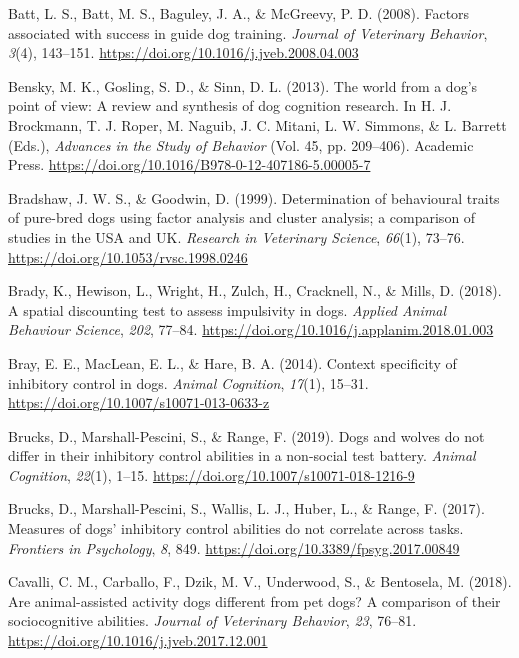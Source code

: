 \documentclass[
  ,pub,floatsintext]{apa6}
\newlength{\cslhangindent}
\newlength{\cslentryspacingunit} %
\newenvironment{CSLReferences}[2] %
 {%
  \setlength{\parindent}{0pt}
  \ifodd #1
  \let\oldpar\par
  \def\par{\hangindent=\cslhangindent\oldpar}
  \fi
  \setlength{\parskip}{#2\cslentryspacingunit}
 }%
 {}
\begin{document}
\begin{CSLReferences}{1}{0}
\leavevmode{}%
Batt, L. S., Batt, M. S., Baguley, J. A., \& McGreevy, P. D. (2008). Factors associated with success in guide dog training. \emph{Journal of Veterinary Behavior}, \emph{3}(4), 143--151. \url{https://doi.org/10.1016/j.jveb.2008.04.003}

\leavevmode{}%
Bensky, M. K., Gosling, S. D., \& Sinn, D. L. (2013). The world from a dog's point of view: A review and synthesis of dog cognition research. In H. J. Brockmann, T. J. Roper, M. Naguib, J. C. Mitani, L. W. Simmons, \& L. Barrett (Eds.), \emph{Advances in the {Study} of {Behavior}} (Vol. 45, pp. 209--406). {Academic Press}. \url{https://doi.org/10.1016/B978-0-12-407186-5.00005-7}

\leavevmode{}%
Bradshaw, J. W. S., \& Goodwin, D. (1999). Determination of behavioural traits of pure-bred dogs using factor analysis and cluster analysis; a comparison of studies in the {USA} and {UK}. \emph{Research in Veterinary Science}, \emph{66}(1), 73--76. \url{https://doi.org/10.1053/rvsc.1998.0246}

\leavevmode{}%
Brady, K., Hewison, L., Wright, H., Zulch, H., Cracknell, N., \& Mills, D. (2018). A spatial discounting test to assess impulsivity in dogs. \emph{Applied Animal Behaviour Science}, \emph{202}, 77--84. \url{https://doi.org/10.1016/j.applanim.2018.01.003}

\leavevmode{}%
Bray, E. E., MacLean, E. L., \& Hare, B. A. (2014). Context specificity of inhibitory control in dogs. \emph{Animal Cognition}, \emph{17}(1), 15--31. \url{https://doi.org/10.1007/s10071-013-0633-z}

\leavevmode{}%
Brucks, D., Marshall-Pescini, S., \& Range, F. (2019). Dogs and wolves do not differ in their inhibitory control abilities in a non-social test battery. \emph{Animal Cognition}, \emph{22}(1), 1--15. \url{https://doi.org/10.1007/s10071-018-1216-9}

\leavevmode{}%
Brucks, D., Marshall-Pescini, S., Wallis, L. J., Huber, L., \& Range, F. (2017). Measures of dogs' inhibitory control abilities do not correlate across tasks. \emph{Frontiers in Psychology}, \emph{8}, 849. \url{https://doi.org/10.3389/fpsyg.2017.00849}

\leavevmode{}%
Cavalli, C. M., Carballo, F., Dzik, M. V., Underwood, S., \& Bentosela, M. (2018). Are animal-assisted activity dogs different from pet dogs? {A} comparison of their sociocognitive abilities. \emph{Journal of Veterinary Behavior}, \emph{23}, 76--81. \url{https://doi.org/10.1016/j.jveb.2017.12.001}


\end{CSLReferences}
\end{document}
